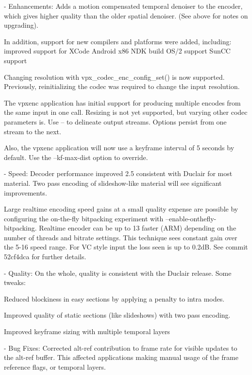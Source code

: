 \begin{DoxyVerbInclude}
  - Enhancements:
      Adds a motion compensated temporal denoiser to the encoder, which
      gives higher quality than the older spatial denoiser. (See above
      for notes on upgrading).

      In addition, support for new compilers and platforms were added,
      including:
        improved support for XCode
        Android x86 NDK build
        OS/2 support
        SunCC support

      Changing resolution with vpx_codec_enc_config_set() is now
      supported. Previously, reinitializing the codec was required to
      change the input resolution.

      The vpxenc application has initial support for producing multiple
      encodes from the same input in one call. Resizing is not yet
      supported, but varying other codec parameters is. Use -- to
      delineate output streams. Options persist from one stream to the
      next.

      Also, the vpxenc application will now use a keyframe interval of
      5 seconds by default. Use the --kf-max-dist option to override.

  - Speed:
      Decoder performance improved 2.5%
      consistent with Duclair for most material. Two pass encoding of
      slideshow-like material will see significant improvements.

      Large realtime encoding speed gains at a small quality expense are
      possible by configuring the on-the-fly bitpacking experiment with
      --enable-onthefly-bitpacking. Realtime encoder can be up to 13%
      faster (ARM) depending on the number of threads and bitrate
      settings. This technique sees constant gain over the 5-16 speed
      range. For VC style input the loss seen is up to 0.2dB. See commit
      52cf4dca for further details.

  - Quality:
      On the whole, quality is consistent with the Duclair release. Some
      tweaks:

        Reduced blockiness in easy sections by applying a penalty to
        intra modes.

        Improved quality of static sections (like slideshows) with
        two pass encoding.

        Improved keyframe sizing with multiple temporal layers

  - Bug Fixes:
      Corrected alt-ref contribution to frame rate for visible updates
      to the alt-ref buffer. This affected applications making manual
      usage of the frame reference flags, or temporal layers.


\end{DoxyVerbInclude}
